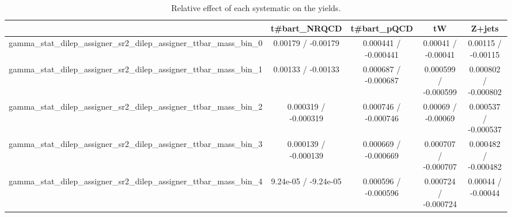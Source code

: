 \documentclass[10pt]{article}
\begin{document}
\begin{table}[htbp]
\begin{center}
\begin{tabular}{|c|c|c|c|c|}
\hline 
      & t#bar{t}_{NRQCD}      & t#bar{t}_{pQCD}      & tW      & Z+jets \\ 
\hline 
  gamma_stat_dilep_assigner_sr2_dilep_assigner_ttbar_mass_bin_0 & 0.00179 / -0.00179 & 0.000441 / -0.000441 & 0.00041 / -0.00041 & 0.00115 / -0.00115 \\ 
  gamma_stat_dilep_assigner_sr2_dilep_assigner_ttbar_mass_bin_1 & 0.00133 / -0.00133 & 0.000687 / -0.000687 & 0.000599 / -0.000599 & 0.000802 / -0.000802 \\ 
  gamma_stat_dilep_assigner_sr2_dilep_assigner_ttbar_mass_bin_2 & 0.000319 / -0.000319 & 0.000746 / -0.000746 & 0.00069 / -0.00069 & 0.000537 / -0.000537 \\ 
  gamma_stat_dilep_assigner_sr2_dilep_assigner_ttbar_mass_bin_3 & 0.000139 / -0.000139 & 0.000669 / -0.000669 & 0.000707 / -0.000707 & 0.000482 / -0.000482 \\ 
  gamma_stat_dilep_assigner_sr2_dilep_assigner_ttbar_mass_bin_4 & 9.24e-05 / -9.24e-05 & 0.000596 / -0.000596 & 0.000724 / -0.000724 & 0.00044 / -0.00044 \\ 
\hline 
\end{tabular} 
\caption{Relative effect of each systematic on the yields.} 
\end{center} 
\end{table} 
\end{document}
